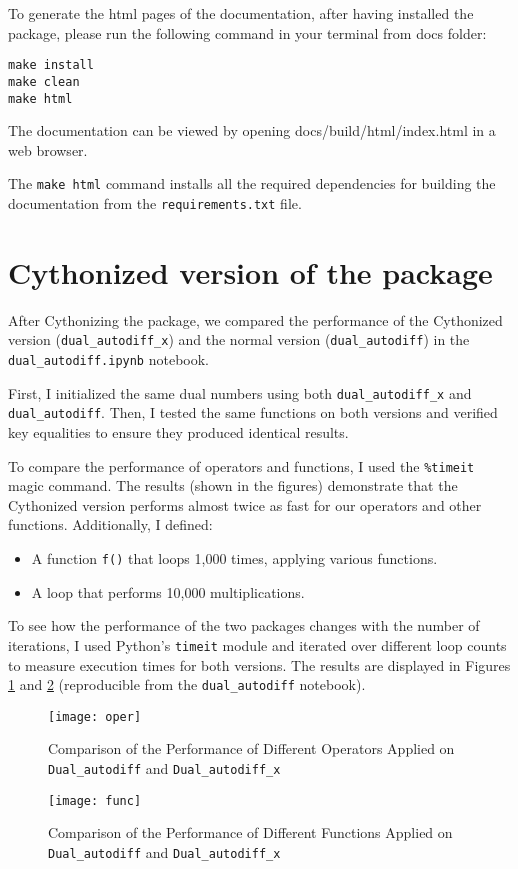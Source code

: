 \documentclass[a4paper,12pt]{article}
\begin{document}
\vspace{10pt}

To generate the html pages of the documentation, after having installed the package,  please run the following command in your terminal from docs folder:
\begin{verbatim}
make install
make clean
make html
\end{verbatim}
The documentation can be viewed by opening docs/build/html/index.html in a web browser.

The \texttt{make html} command installs all the required dependencies for building the documentation from the \texttt{requirements.txt} file.
\section{Cythonized version of the package}

After Cythonizing the package, we compared the performance of the Cythonized version (\texttt{dual\_autodiff\_x}) and the normal version (\texttt{dual\_autodiff}) in the \texttt{dual\_autodiff.ipynb} notebook.

First, I initialized the same dual numbers using both \texttt{dual\_autodiff\_x} and \texttt{dual\_autodiff}.  
Then, I tested the same functions on both versions and verified key equalities to ensure they produced identical results.

To compare the performance of operators and functions, I used the \texttt{\%timeit} magic command. The results (shown in the figures) demonstrate that the Cythonized version performs almost twice as fast for our operators and other functions.  
Additionally, I defined:
\begin{itemize}
    \item A function \texttt{f()} that loops 1,000 times, applying various functions.
    \item A loop that performs 10,000 multiplications.
\end{itemize}


To see how the performance of the two packages changes with the number of iterations, I used Python’s \texttt{timeit} module and iterated over different loop counts to measure execution times for both versions. The results are displayed in Figures \ref{fig:fig3} and \ref{fig:fig4} (reproducible from the \texttt{dual\_autodiff} notebook).  
 \begin{figure}[H]
    \centering
    \texttt{[image: oper]} 
    \caption{Comparison of the Performance of Different Operators Applied on \texttt{Dual\_autodiff} and \texttt{Dual\_autodiff_x}}
    \label{fig:fig3}
\end{figure}
 \begin{figure}[H]
    \centering
    \texttt{[image: func]} 
    \caption{Comparison of the Performance of Different Functions Applied on \texttt{Dual\_autodiff} and \texttt{Dual\_autodiff_x}}
    \label{fig:fig4}
\end{figure}
\end{document}
